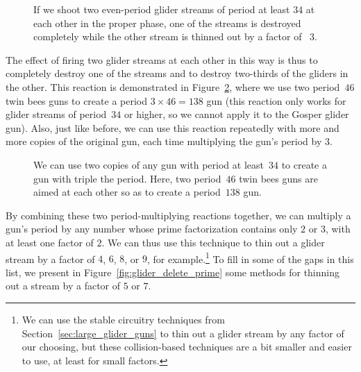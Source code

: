 \begin{figure}[!htb]
	\centering
	\caption{If we shoot two even-period glider streams of period at least $34$ at each other in the proper phase, one of the streams is destroyed completely while the other stream is thinned out by a factor of ~$3$.}\label{fig:glider_delete2}
\end{figure}

The effect of firing two glider streams at each other in this way is thus to completely destroy one of the streams and to destroy two-thirds of the gliders in the other. This reaction is demonstrated in Figure~\ref{fig:p138_gun}, where we use two period~$46$ twin bees guns to create a period $3 \times 46 = 138$ gun (this reaction only works for glider streams of period~$34$ or higher, so we cannot apply it to the Gosper glider gun). Also, just like before, we can use this reaction repeatedly with more and more copies of the original gun, each time multiplying the gun's period by $3$.

\begin{figure}[!htb]
	\centering
	\caption{We can use two copies of any gun with period at least~$34$ to create a gun with triple the period. Here, two period~$46$ twin bees guns are aimed at each other so as to create a period~$138$ gun.}\label{fig:p138_gun}
\end{figure}

By combining these two period-multiplying reactions together, we can multiply a gun's period by any number whose prime factorization contains only $2$ or $3$, with at least one factor of $2$. We can thus use this technique to thin out a glider stream by a factor of $4$, $6$, $8$, or $9$, for example.\footnote{We can use the stable circuitry techniques from Section~\ref{sec:large_glider_guns} to thin out a glider stream by any factor of our choosing, but these collision-based techniques are a bit smaller and easier to use, at least for small factors.} To fill in some of the gaps in this list, we present in Figure~\ref{fig:glider_delete_prime} some methods for thinning out a stream by a factor of $5$ or $7$.

